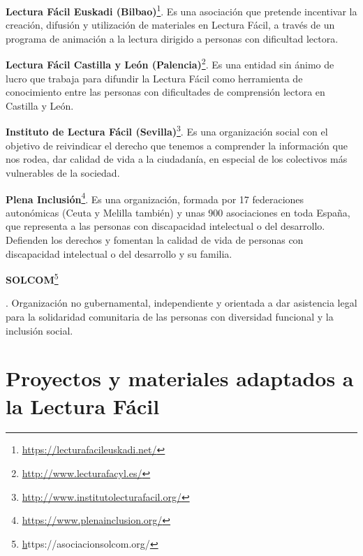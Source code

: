 \begin{itemize}
{{	\item{\textbf{Lectura Fácil Euskadi (Bilbao)}\footnote{\href{https://lecturafacileuskadi.net/}{https://lecturafacileuskadi.net/}}}. Es una asociación que pretende incentivar la creación, difusión y utilización de materiales en Lectura Fácil, a través de un programa de animación a la lectura dirigido a personas con dificultad lectora.
	
	\item{\textbf{Lectura Fácil Castilla y León (Palencia)}\footnote{\href{http://www.lecturafacyl.es/}{http://www.lecturafacyl.es/}}}. Es una entidad sin ánimo de lucro que trabaja para difundir la Lectura Fácil como herramienta de conocimiento entre las personas con dificultades de comprensión lectora en Castilla y León.
	
	\item{\textbf{Instituto de Lectura Fácil (Sevilla)}\footnote{\href{http://www.institutolecturafacil.org/}{http://www.institutolecturafacil.org/}}}. Es una organización social con el objetivo de reivindicar el derecho que tenemos a comprender la información que nos rodea, dar calidad de vida a la ciudadanía, en especial de los colectivos más vulnerables de la sociedad.
	
		\item{\textbf{Plena Inclusión}\footnote{\href{https://www.plenainclusion.org/}{https://www.plenainclusion.org/}}}. Es una organización, formada por 17 federaciones autonómicas (Ceuta y Melilla también) y unas 900 asociaciones en toda España, que representa a las personas con discapacidad intelectual o del desarrollo.	Defienden los derechos y fomentan la calidad de vida de personas con discapacidad intelectual o del desarrollo y su familia. 
		
	
		\item{\textbf{SOLCOM}}\footnote{\href{https://asociacionsolcom.org/}https://asociacionsolcom.org/}}}. Organización no gubernamental, independiente y orientada a dar asistencia legal para la solidaridad comunitaria de las personas con diversidad funcional y la inclusión social.
		
\end{itemize}


\section{Proyectos y materiales adaptados a la Lectura Fácil}

